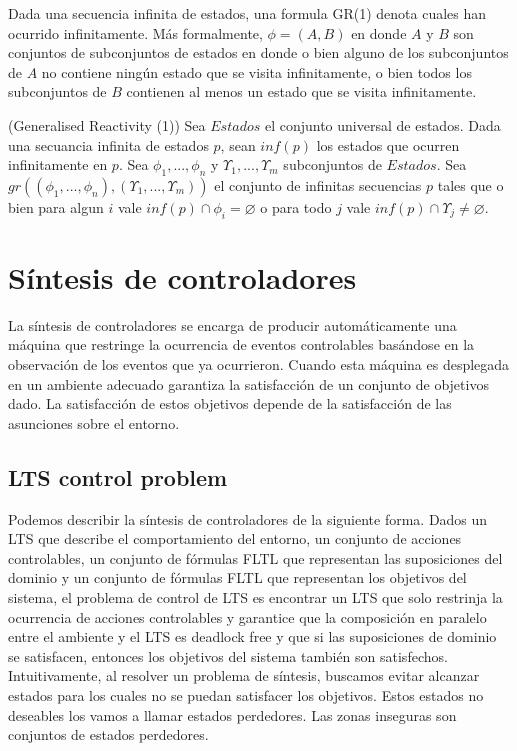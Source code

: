 Dada una secuencia infinita de estados, una formula GR(1) \cite{SRD} denota cuales han ocurrido infinitamente. 
Más formalmente, $\phi = (A, B)$ en donde $A$ y $B$ son conjuntos de subconjuntos de estados en donde o bien alguno de los
subconjuntos de $A$ no contiene ningún estado que se visita infinitamente, o bien todos los subconjuntos de $B$ contienen 
al menos un estado que se visita infinitamente.

\begin{definition}{(Generalised Reactivity (1))}
Sea $Estados$ el conjunto universal de estados. Dada una secuancia infinita de estados $p$, sean $inf(p)$ los estados que
ocurren infinitamente en $p$. Sea $\phi_{1}, ..., \phi_{n}$ y $\varUpsilon_{1}, ..., \varUpsilon_{m}$ subconjuntos de $Estados$. Sea\\
$gr((\phi_{1}, ..., \phi_{n}), (\varUpsilon_{1}, ..., \varUpsilon_{m}))$ el conjunto de infinitas secuencias $p$ tales que
o bien para algun $i$ vale $inf(p)\cap\phi_{i} = \varnothing$ o para todo $j$ vale $inf(p)\cap\varUpsilon_{j} \neq \varnothing$.
\end{definition}

\section{Síntesis de controladores}

La síntesis de controladores se encarga de producir automáticamente una máquina que restringe la ocurrencia de eventos
controlables basándose en la observación de los eventos que ya ocurrieron. Cuando esta máquina es desplegada en un ambiente
adecuado garantiza la satisfacción de un conjunto de objetivos dado. La satisfacción de estos objetivos depende de la
satisfacción de las asunciones sobre el entorno.

\subsection{LTS control problem}

Podemos describir la síntesis de controladores de la siguiente forma. Dados un LTS que describe el comportamiento
del entorno, un conjunto de acciones controlables, un conjunto de fórmulas FLTL que representan las suposiciones
del dominio y un conjunto de fórmulas FLTL que representan los objetivos del sistema, el problema de control de
LTS \cite{LTSControl} es encontrar un LTS que solo restrinja la ocurrencia de acciones controlables y garantice que la composición
en paralelo entre el ambiente y el LTS es deadlock free y que si las suposiciones de dominio se satisfacen, entonces
los objetivos del sistema también son satisfechos. Intuitivamente, al resolver un problema de síntesis, buscamos evitar alcanzar
estados para los cuales no se puedan satisfacer los objetivos. Estos estados no deseables los vamos a llamar estados perdedores.
Las zonas inseguras son conjuntos de estados perdedores.

